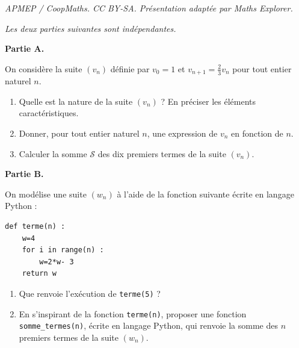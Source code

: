 \documentclass[10pt]{article}
\begin{document}
\noindent\textit{APMEP / CoopMaths. CC BY-SA. Présentation adaptée par Maths Explorer.}\par\medskip
\medskip

\emph{Les deux parties suivantes sont indépendantes.}

\medskip

\textbf{Partie A.} 

\medskip

On considère la suite $\left(v_n\right)$ définie par $v_0=1$ et $v_{n+1} = \frac{2}{3}v_n$ pour tout entier naturel $n$.

\medskip

\begin{enumerate}
\item Quelle est la nature de la suite $\left(v_n\right)$ ? En préciser les éléments caractéristiques.
\item Donner, pour tout entier naturel $n$, une expression de $v_n$ en fonction de $n$.
\item Calculer la somme $\mathscr{S}$ des dix premiers termes de la suite $\left(v_n\right)$.
\end{enumerate}
\medskip

\textbf{Partie B.}

\medskip

On modélise une suite $\left(w_n\right)$ à l'aide de la fonction suivante écrite en langage Python :

\begin{lstlisting}[style=python]
def terme(n) :
	w=4
	for i in range(n) :
		w=2*w- 3
	return w
   \end{lstlisting}

\begin{enumerate}[resume]
\item Que renvoie l'exécution de \verb|terme(5)| ?
\item En s'inspirant de la fonction \verb|terme(n)|, proposer une fonction \verb|somme_termes(n)|, écrite en langage Python, qui renvoie la somme des $n$ premiers termes de la suite 
$\left(w_n\right)$.
\end{enumerate}

\vspace{0,5cm}
\end{document}
